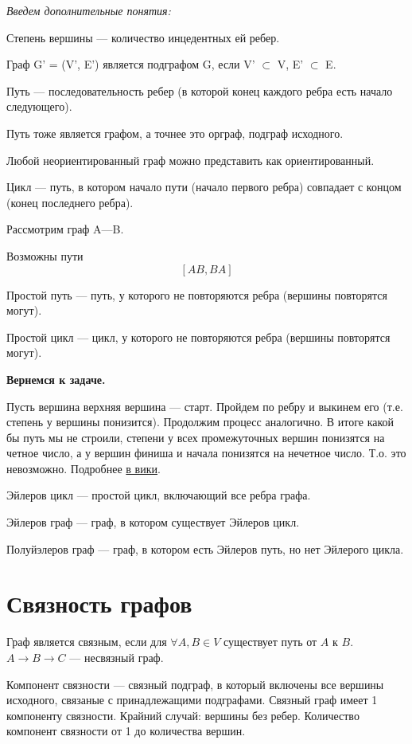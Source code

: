 \documentclass[a4paper,12pt]{article}
\theoremstyle{plain} %
\theoremstyle{definition} %
\theoremstyle{remark} %
\begin{document}
\textit{Введем дополнительные понятия:}

Степень вершины --- количество инцедентных ей ребер.

Граф G' = (V', E') является подграфом G, если V' $\subset$ V, E' $\subset$ E.

Путь --- последовательность ребер (в которой конец каждого ребра есть начало следующего).

Путь тоже является графом, а точнее это орграф, подграф исходного.

Любой неориентированный граф можно представить как ориентированный.

Цикл --- путь, в котором начало пути (начало первого ребра) совпадает с концом (конец последнего ребра).

Рассмотрим граф A---B.

Возможны пути
$$[AB, BA]$$

Простой путь --- путь, у которого не повторяются ребра (вершины повторятся могут).

Простой цикл ---  цикл, у которого не повторяются ребра (вершины повторятся могут).

\textbf{Вернемся к задаче.}

Пусть вершина верхняя вершина --- старт. Пройдем по ребру и выкинем его (т.е. степень у вершины понизится). Продолжим процесс аналогично. В итоге какой бы путь мы не строили, степени у всех промежуточных вершин понизятся на четное число, а у вершин финиша и начала понизятся на нечетное число. Т.о. это невозможно. Подробнее \href{https://ru.wikipedia.org/wiki/%D0%97%D0%B0%D0%B4%D0%B0%D1%87%D0%B0_%D0%BE_%D1%81%D0%B5%D0%BC%D0%B8_%D0%BA%D1%91%D0%BD%D0%B8%D0%B3%D1%81%D0%B1%D0%B5%D1%80%D0%B3%D1%81%D0%BA%D0%B8%D1%85_%D0%BC%D0%BE%D1%81%D1%82%D0%B0%D1%85}{в вики}.

Эйлеров цикл --- простой цикл, включающий все ребра графа.

Эйлеров граф --- граф, в котором существует Эйлеров цикл.

Полуйэлеров граф --- граф, в котором есть Эйлеров путь, но нет Эйлерого цикла.

\section{Связность графов}
Граф является связным, если для $\forall A,B \in V$ существует путь от $A$ к $B$.\\
$A\longrightarrow B\longrightarrow C$ --- несвязный граф.

Компонент связности --- связный подграф, в который включены все вершины исходного, связаные с принадлежащими подграфами. Связный граф имеет 1 компоненту связности. Крайний случай: вершины без ребер. Количество компонент связности от 1 до количества вершин.
\end{document}
